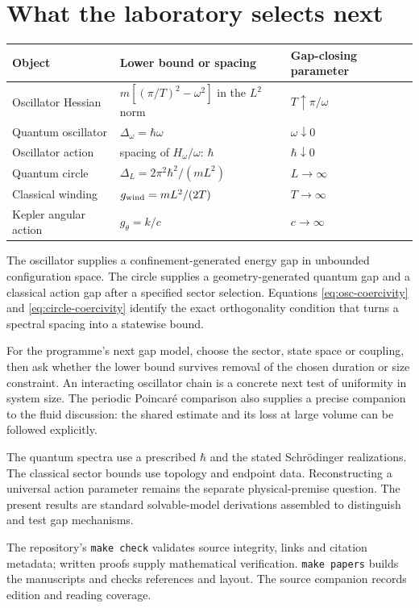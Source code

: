 \documentclass[11pt,a4paper]{article}
\begin{document}
\section{What the laboratory selects next}
\begin{center}
\begin{tabularx}{\linewidth}{@{}lXl@{}}
\toprule
Object & Lower bound or spacing & Gap-closing parameter \\
\midrule
Oscillator Hessian & $m[(\pi/T)^2-\omega^2]$ in the $L^2$ norm & $T\uparrow\pi/\omega$ \\
Quantum oscillator & $\Delta_\omega=\hbar\omega$ & $\omega\downarrow0$ \\
Oscillator action & spacing of $H_\omega/\omega$: $\hbar$ & $\hbar\downarrow0$ \\
Quantum circle & $\Delta_L=2\pi^2\hbar^2/(mL^2)$ & $L\to\infty$ \\
Classical winding & $g_{\rm wind}=mL^2/(2T)$ & $T\to\infty$ \\
Kepler angular action & $g_\theta=k/c$ & $c\to\infty$ \\
\bottomrule
\end{tabularx}
\end{center}

The oscillator supplies a confinement-generated energy gap in unbounded
configuration space. The circle supplies a geometry-generated quantum gap and
a classical action gap after a specified sector selection. Equations
\eqref{eq:osc-coercivity} and \eqref{eq:circle-coercivity} identify the exact
orthogonality condition that turns a spectral spacing into a statewise bound.

For the programme's next gap model, choose the sector, state space or coupling,
then ask whether the lower bound survives removal of the chosen duration or
size constraint. An interacting oscillator chain is a concrete next test of
uniformity in system size. The periodic Poincar\'e comparison also supplies a
precise companion to the fluid discussion: the shared estimate and its loss
at large volume can be followed explicitly.

The quantum spectra use a prescribed $\hbar$ and the stated Schr\"odinger
realizations. The classical sector bounds use topology and endpoint data.
Reconstructing a universal action parameter remains the separate physical-premise
question. The present results are standard solvable-model derivations assembled
to distinguish and test gap mechanisms.

The repository's \texttt{make check} validates source integrity, links and
citation metadata; written proofs supply mathematical verification.
\texttt{make papers} builds the manuscripts and checks references
and layout. The source companion records edition and reading coverage.


\end{document}
